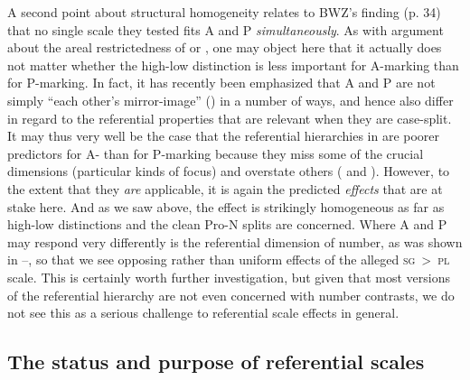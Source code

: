 \documentclass[output=paper]{langscibook}
\begin{document}
A second point about structural homogeneity relates to BWZ’s finding (p. 34) that no single scale they tested fits A and P \textit{simultaneously}. As with  argument about the areal restrictedness of  or , one may object here that it actually does not matter whether the high-low distinction is less important for A-marking than for P-marking. In fact, it has recently been emphasized that A and P are not simply “each other’s mirror-image” (\citealt{Fauconnieretal2014A})  in a number of ways, and hence also differ in regard to the referential properties that are relevant when they are case-split. It may thus very well be the case that the referential hierarchies in  are poorer predictors for A- than for P-marking because they miss some of the crucial dimensions (\eg particular kinds of focus) and overstate others (\eg {} and ). However, to the extent that they \textit{are} applicable, it is again the predicted \textit{effects} that are at stake here. And as we saw above, the effect is strikingly homogeneous as far as high-low distinctions and the clean Pro-N splits are concerned. Where A and P may respond very differently is the referential dimension of number, as was shown in --, so that we see opposing rather than uniform effects of the alleged \textsc{sg}~>~\textsc{pl} scale. This is certainly worth further investigation, but given that most versions of the referential hierarchy are not even concerned with number contrasts, we do not see this as a serious challenge to referential scale effects in general.

\subsection{The status and purpose of referential scales}
\label{18-sc-subsec:4-4}
\end{document}
